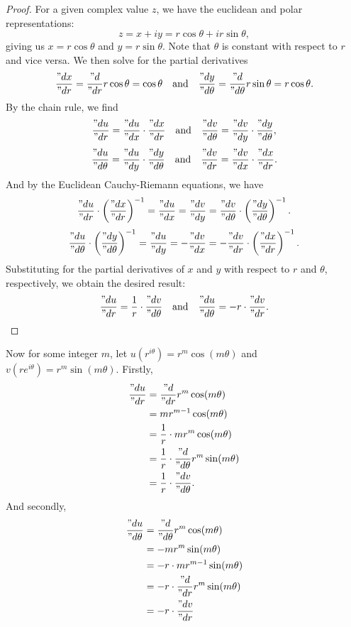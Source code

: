 \documentclass[12pt]{article}
\newcommand{\isp}[1]{\quad\text{#1}\quad}
\begin{document}
\begin{proof}
    For a given complex value $z$, we have the euclidean and polar representations:
    \[z=x+iy = r\cos\theta + ir\sin\theta,\]
    giving us $x=r\cos\theta$ and $y=r\sin\theta$. Note that $\theta$ is constant with respect to $r$ and vice versa. We then solve for the partial derivatives
    \[\frac{"dx}{"dr} = \frac{"d}{"dr}r\cos\theta = \cos\theta \isp{and} \frac{"dy}{"d\theta} = \frac{"d}{"d\theta}r\sin\theta = r\cos\theta.\]
    By the chain rule, we find
    \[\frac{"du}{"dr} = \frac{"du}{"dx}\cdot\frac{"dx}{"dr} \isp{and} \frac{"dv}{"d\theta} = \frac{"dv}{"dy}\cdot\frac{"dy}{"d\theta},\]
    \[\frac{"du}{"d\theta} = \frac{"du}{"dy}\cdot\frac{"dy}{"d\theta} \isp{and} \frac{"dv}{"dr} = \frac{"dv}{"dx}\cdot\frac{"dx}{"dr}.\]
    And by the Euclidean Cauchy-Riemann equations, we have
    \[\frac{"du}{"dr}\cdot\left(\frac{"dx}{"dr}\right)^{-1} = \frac{"du}{"dx} = \frac{"dv}{"dy} = \frac{"dv}{"d\theta}\cdot\left(\frac{"dy}{"d\theta}\right)^{-1}.\]
    \[\frac{"du}{"d\theta}\cdot\left(\frac{"dy}{"d\theta}\right)^{-1} = \frac{"du}{"dy} = -\frac{"dv}{"dx} = -\frac{"dv}{"dr}\cdot\left(\frac{"dx}{"dr}\right)^{-1}.\]
    Substituting for the partial derivatives of $x$ and $y$ with respect to $r$ and $\theta$, respectively, we obtain the desired result:
     \[\frac{"du}{"dr} = \frac1r\cdot\frac{"dv}{"d\theta} \isp{and} \frac{"du}{"d\theta} = -r\cdot\frac{"dv}{"dr}.\]
    
\end{proof}

Now for some integer $m$, let $u(r^{i\theta})=r^m\cos(m\theta)$ and $v(re^{i\theta}) = r^m\sin(m\theta)$. Firstly,
\begin{align*}
 \frac{"du}{"dr}
    &= \frac{"d}{"dr}r^m\cos(m\theta) \\
    &= mr^{m-1}\cos(m\theta) \\
    &= \frac1r\cdot mr^m\cos(m\theta)\\
    &= \frac1r\cdot \frac{"d}{"d\theta}r^m\sin(m\theta) \\
    &= \frac1r\cdot \frac{"dv}{"d\theta}.
\end{align*}
And secondly,
\begin{align*}
\frac{"du}{"d\theta}
    &= \frac{"d}{"d\theta}r^m\cos(m\theta)\\
    &= -mr^m\sin(m\theta) \\
    &= -r\cdot mr^{m-1}\sin(m\theta) \\
    &= -r\cdot \frac{"d}{"dr}r^m\sin(m\theta) \\
    &= -r\cdot\frac{"dv}{"dr}
\end{align*}
\end{document}
